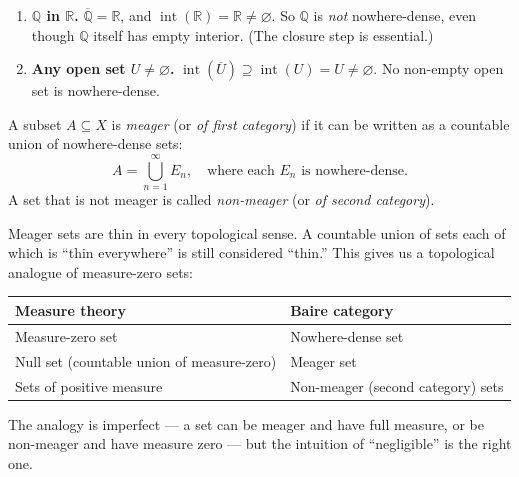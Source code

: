 \begin{example}
\label{ex:not-nowhere-dense}
\begin{enumerate}[label=(\alph*)]
  \item \textbf{$\mathbb{Q}$ in $\mathbb{R}$.}
        $\overline{\mathbb{Q}} = \mathbb{R}$, and
        $\operatorname{int}(\mathbb{R}) = \mathbb{R} \neq \varnothing$.
        So $\mathbb{Q}$ is \emph{not} nowhere-dense,
        even though $\mathbb{Q}$ itself has empty interior.
        (The closure step is essential.)

  \item \textbf{Any open set $U \neq \varnothing$.}
        $\operatorname{int}(\overline{U}) \supseteq \operatorname{int}(U) = U \neq \varnothing$.
        No non-empty open set is nowhere-dense.
\end{enumerate}
\end{example}

\begin{tcolorbox}[colback=defbox, colframe=defborder, arc=2pt,
  left=6pt, right=6pt, top=4pt, bottom=4pt,
  title={\small\textbf{Definition (Meager / First Category)}},
  fonttitle=\small\bfseries]
\begin{definition}
\label{def:meager}
A subset $A \subseteq X$ is \emph{meager} (or \emph{of first category})
if it can be written as a countable union of nowhere-dense sets:
\[
A = \bigcup_{n=1}^{\infty} E_n,
\quad \text{where each } E_n \text{ is nowhere-dense.}
\]
A set that is not meager is called \emph{non-meager} (or
\emph{of second category}).
\end{definition}
\end{tcolorbox}

\begin{remark*}
Meager sets are thin in every topological sense.
A countable union of sets each of which is ``thin everywhere'' is
still considered ``thin.''
This gives us a topological analogue of measure-zero sets:
\begin{center}
\begin{tabular}{l l}
\toprule
\textbf{Measure theory} & \textbf{Baire category} \\
\midrule
Measure-zero set & Nowhere-dense set \\
Null set (countable union of measure-zero) & Meager set \\
Sets of positive measure & Non-meager (second category) sets \\
\bottomrule
\end{tabular}
\end{center}
The analogy is imperfect --- a set can be meager and have full measure,
or be non-meager and have measure zero --- but the intuition of
``negligible'' is the right one.
\end{remark*}

